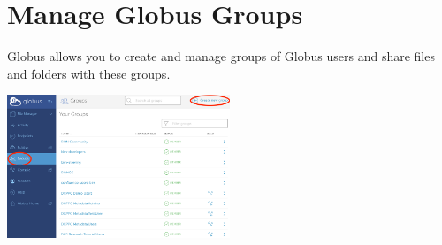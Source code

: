 \chapter{Manage Globus Groups}
Globus allows you to create and manage groups of Globus users and share files and folders with these groups.

\begin{center}
\includegraphics[width=0.5\textwidth]{img/groups-1.png}
\end{center}

